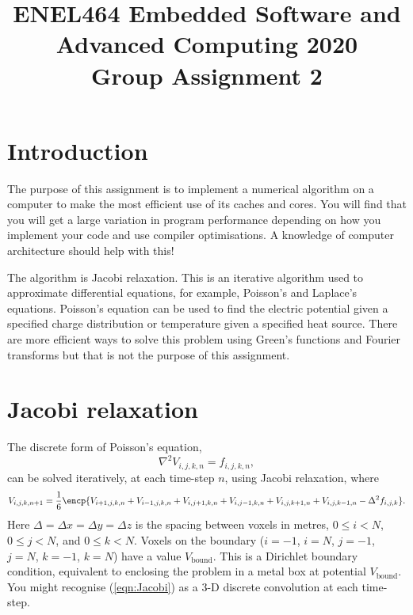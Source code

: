 \documentclass[a4paper,11pt]{article}
\begin{document}
\title{ \bf ENEL464 Embedded Software and Advanced Computing 2020 \\ Group Assignment 2}
\author{}
\date{}
\maketitle


\section{Introduction}

The purpose of this assignment is to implement a numerical algorithm
on a computer to make the most efficient use of its caches and cores.
You will find that you will get a large variation in program
performance depending on how you implement your code and use compiler
optimisations.  A knowledge of computer architecture should help with
this!

The algorithm is Jacobi relaxation.  This is an iterative algorithm
used to approximate differential equations, for example, Poisson's and
Laplace's equations.  Poisson's equation can be used to find the
electric potential given a specified charge distribution or
temperature given a specified heat source.  There are more efficient
ways to solve this problem using Green's functions and Fourier
transforms but that is not the purpose of this assignment.

\section{Jacobi relaxation}

The discrete form of Poisson's equation,
%
\begin{equation}
  \nabla^2 V_{i,j,k,n} = f_{i,j,k,n},
\end{equation}
%
can be solved iteratively, at each time-step $n$, using Jacobi
relaxation, where
%
\begin{equation}
  V_{i,j,k,n+1} = \frac{1}{6}\encp{V_{i+1,j,k,n} + V_{i-1,j,k,n} + V_{i,j+1,k,n} + V_{i,j-1,k,n} + V_{i,j,k+1,n} + V_{i,j,k-1,n} - \Delta^2 f_{i,j,k}}.
\label{eqn:Jacobi}
\end{equation}
%
Here $\Delta = \Delta x = \Delta y = \Delta z$ is the spacing between
voxels in metres, $0 \le i < N$, $0 \le j < N$, and $0 \le k < N$.
Voxels on the boundary ($i = -1$, $i=N$, $j = -1$, $j=N$, $k = -1$,
$k=N$) have a value $V_{\mathrm{bound}}$.  This is a Dirichlet
boundary condition, equivalent to enclosing the problem in a metal box
at potential $V_{\mathrm{bound}}$.  You might recognise
(\ref{eqn:Jacobi}) as a 3-D discrete convolution at each time-step.
\end{document}
